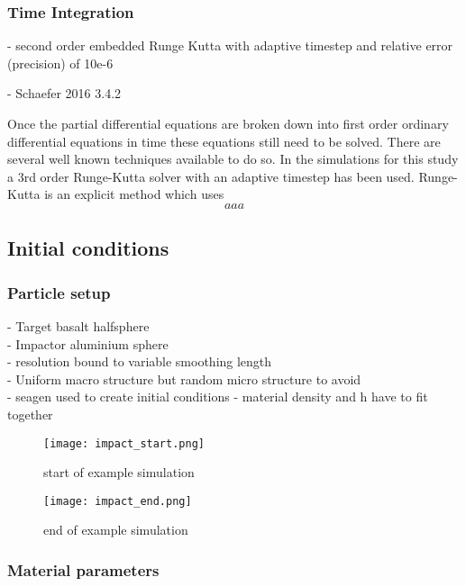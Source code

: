 \subsubsection{Time Integration}
- second order embedded Runge Kutta with adaptive timestep and relative error (precision) of 10e-6

- Schaefer 2016 3.4.2

Once the partial differential equations are broken down into first order ordinary differential equations in time these equations still need to be solved. There are several well known techniques available to do so. In the simulations for this study a 3rd order Runge-Kutta solver with an adaptive timestep has been used. Runge-Kutta is an explicit method which uses
\begin{equation}
    aaa
\end{equation}


\subsection{Initial conditions}
\subsubsection{Particle setup}
- Target basalt halfsphere \\
- Impactor aluminium sphere \\
- resolution bound to variable smoothing length \\
- Uniform macro structure but random micro structure to avoid \\
- seagen \cite{github:SEAGen} used to create initial conditions
- material density and h have to fit together

\begin{figure}[H]
    \centering
    \texttt{[image: impact\_start.png]}
    \caption{start of example simulation}
    \label{fig:impact_start}
\end{figure}

\begin{figure}[H]
    \centering
    \texttt{[image: impact\_end.png]}
    \caption{end of example simulation}
    \label{fig:impact_end}
\end{figure}

\subsubsection{Material parameters} \label{sect:material_parameters}

